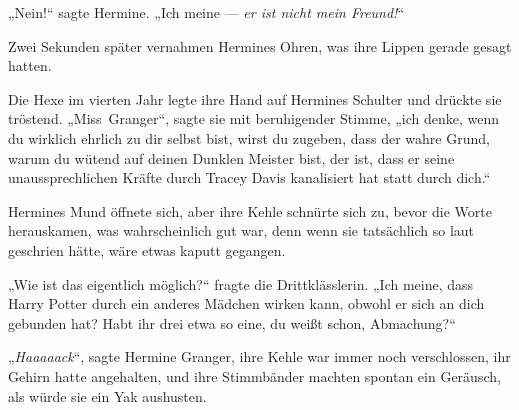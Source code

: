 „Nein!“ sagte Hermine.
„Ich meine — \emph{er ist nicht mein Freund!}“

Zwei Sekunden später vernahmen Hermines Ohren, was ihre Lippen gerade gesagt hatten.

Die Hexe im vierten Jahr legte ihre Hand auf Hermines Schulter und drückte sie tröstend.
„Miss~Granger“, sagte sie mit beruhigender Stimme, „ich denke, wenn du wirklich ehrlich zu dir selbst bist, wirst du zugeben, dass der wahre Grund, warum du wütend auf deinen Dunklen Meister bist, der ist, dass er seine unaussprechlichen Kräfte durch Tracey Davis kanalisiert hat statt durch dich.“

Hermines Mund öffnete sich, aber ihre Kehle schnürte sich zu, bevor die Worte herauskamen, was wahrscheinlich gut war, denn wenn sie tatsächlich so laut geschrien hätte, wäre etwas kaputt gegangen.

„Wie ist das eigentlich möglich?“ fragte die Drittklässlerin.
„Ich meine, dass Harry Potter durch ein anderes Mädchen wirken kann, obwohl er sich an dich gebunden hat? Habt ihr drei etwa so eine, du weißt schon, Abmachung?“

„\emph{Haaaaack}“, sagte Hermine Granger, ihre Kehle war immer noch verschlossen, ihr Gehirn hatte angehalten, und ihre Stimmbänder machten spontan ein Geräusch, als würde sie ein Yak aushusten.


